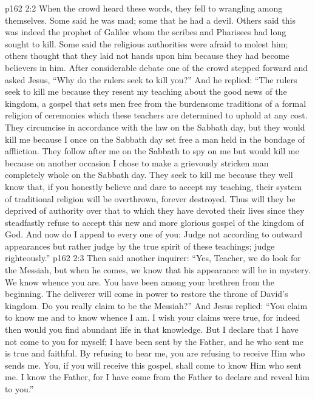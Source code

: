 \vs p162 2:2 \pc When the crowd heard these words, they fell to wrangling among themselves. Some said he was mad; some that he had a devil. Others said this was indeed the prophet of Galilee whom the scribes and Pharisees had long sought to kill. Some said the religious authorities were afraid to molest him; others thought that they laid not hands upon him because they had become believers in him. After considerable debate one of the crowd stepped forward and asked Jesus, “Why do the rulers seek to kill you?” And he replied: \textcolor{ubdarkred}{“The rulers seek to kill me because they resent my teaching about the good news of the kingdom, a gospel that sets men free from the burdensome traditions of a formal religion of ceremonies which these teachers are determined to uphold at any cost. They circumcise in accordance with the law on the Sabbath day, but they would kill me because I once on the Sabbath day set free a man held in the bondage of affliction. They follow after me on the Sabbath to spy on me but would kill me because on another occasion I chose to make a grievously stricken man completely whole on the Sabbath day. They seek to kill me because they well know that, if you honestly believe and dare to accept my teaching, their system of traditional religion will be overthrown, forever destroyed. Thus will they be deprived of authority over that to which they have devoted their lives since they steadfastly refuse to accept this new and more glorious gospel of the kingdom of God. And now do I appeal to every one of you: Judge not according to outward appearances but rather judge by the true spirit of these teachings; judge righteously.”}
\vs p162 2:3 Then said another inquirer: “Yes, Teacher, we do look for the Messiah, but when he comes, we know that his appearance will be in mystery. We know whence you are. You have been among your brethren from the beginning. The deliverer will come in power to restore the throne of David’s kingdom. Do you really claim to be the Messiah?” And Jesus replied: \textcolor{ubdarkred}{“You claim to know me and to know whence I am. I wish your claims were true, for indeed then would you find abundant life in that knowledge. But I declare that I have not come to you for myself; I have been sent by the Father, and he who sent me is true and faithful. By refusing to hear me, you are refusing to receive Him who sends me. You, if you will receive this gospel, shall come to know Him who sent me. I know the Father, for I have come from the Father to declare and reveal him to you.”}

